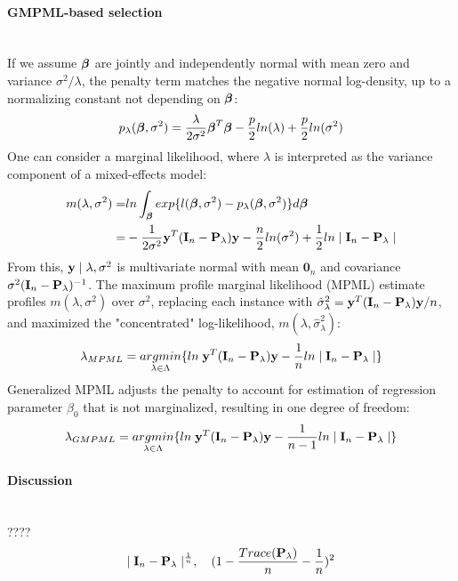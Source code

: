 \documentclass[11pt]{article}
\begin{document}
\paragraph{GMPML-based selection}\mbox{}\\
If we assume $\boldsymbol{\beta}$ are jointly and independently normal with mean zero and variance $\sigma^2/\lambda$, the penalty term matches the negative normal log-density, up to a normalizing constant not depending on $\boldsymbol{\beta}$:
\begin{align*}
p_\lambda(\boldsymbol{\beta}, \sigma^2)=\frac{\lambda}{2\sigma^2}\boldsymbol{\beta}^T\boldsymbol{\beta}-\frac{p}{2}ln(\lambda)+\frac{p}{2}ln(\sigma^2)
\end{align*}
One can consider a marginal likelihood, where $\lambda$ is interpreted as the variance component of a mixed-effects model:
\begin{align*}
m(\lambda, \sigma^2)=&ln \int_{\boldsymbol{\beta}} exp\{ l(\boldsymbol{\beta}, \sigma^2)-p_\lambda(\boldsymbol{\beta}, \sigma^2)\}d\boldsymbol{\beta} \\=&-\frac{1}{2\sigma^2}{\bf y}^T({\bf I}_n-{\bf P}_\lambda){\bf y}-\frac{n}{2}ln(\sigma^2)+\frac{1}{2}ln \mid {\bf I}_n-{\bf P}_\lambda \mid
\end{align*}
From this, ${\bf y} \mid \lambda, \sigma^2$ is multivariate normal with mean $\mathbf{0}_n$ and covariance $\sigma^2({\bf I}_n-{\bf P}_\lambda)^{-1}$. The maximum profile marginal likelihood (MPML) estimate profiles $m(\lambda, \sigma^2)$ over $\sigma^2$, replacing each instance with $\hat{\sigma}_\lambda^2={\bf y}^T({\bf I}_n-{\bf P}_\lambda){\bf y}/n$, and maximized the "concentrated" log-likelihood, $m(\lambda, \hat{\sigma}_\lambda^2)$:
\begin{align*}
\lambda_{MPML}=\underset{\lambda \in \Lambda}{argmin}\{ln\; {\bf y}^T({\bf I}_n-{\bf P}_\lambda){\bf y}-\frac{1}{n}ln \mid {\bf I}_n-{\bf P}_\lambda \mid\}
\end{align*}
Generalized MPML adjusts the penalty to account for estimation of regression parameter $\beta_0$ that is not marginalized, resulting in one degree of freedom:
\begin{align}
\lambda_{GMPML}=\underset{\lambda \in \Lambda}{argmin}\{ln\; {\bf y}^T({\bf I}_n-{\bf P}_\lambda){\bf y}-\frac{1}{n-1}ln \mid {\bf I}_n-{\bf P}_\lambda \mid\}
\end{align}

\vspace{2em}
\paragraph{Discussion}\mbox{}\\
????
\begin{align*}
\mid {\bf I}_n-{\bf P}_\lambda \mid^{\frac{1}{n}}, \quad (1-\frac{Trace({\bf P}_\lambda)}{n}-\frac{1}{n})^2
\end{align*}
\end{document}

